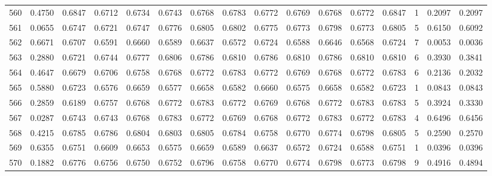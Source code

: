 \begin{tabular}{lrrrrrrrrrrrrrrr}
560 &      0.4750 &  0.6847 &  0.6712 &  0.6734 &  0.6743 &  0.6768 &  0.6783 &  0.6772 &  0.6769 &  0.6768 &   0.6772 &     0.6847 &      1 &                    0.2097 &                     0.2097 \\
561 &      0.0655 &  0.6747 &  0.6721 &  0.6747 &  0.6776 &  0.6805 &  0.6802 &  0.6775 &  0.6773 &  0.6798 &   0.6773 &     0.6805 &      5 &                    0.6150 &                     0.6092 \\
562 &      0.6671 &  0.6707 &  0.6591 &  0.6660 &  0.6589 &  0.6637 &  0.6572 &  0.6724 &  0.6588 &  0.6646 &   0.6568 &     0.6724 &      7 &                    0.0053 &                     0.0036 \\
563 &      0.2880 &  0.6721 &  0.6744 &  0.6777 &  0.6806 &  0.6786 &  0.6810 &  0.6786 &  0.6810 &  0.6786 &   0.6810 &     0.6810 &      6 &                    0.3930 &                     0.3841 \\
564 &      0.4647 &  0.6679 &  0.6706 &  0.6758 &  0.6768 &  0.6772 &  0.6783 &  0.6772 &  0.6769 &  0.6768 &   0.6772 &     0.6783 &      6 &                    0.2136 &                     0.2032 \\
565 &      0.5880 &  0.6723 &  0.6576 &  0.6659 &  0.6577 &  0.6658 &  0.6582 &  0.6660 &  0.6575 &  0.6658 &   0.6582 &     0.6723 &      1 &                    0.0843 &                     0.0843 \\
566 &      0.2859 &  0.6189 &  0.6757 &  0.6768 &  0.6772 &  0.6783 &  0.6772 &  0.6769 &  0.6768 &  0.6772 &   0.6783 &     0.6783 &      5 &                    0.3924 &                     0.3330 \\
567 &      0.0287 &  0.6743 &  0.6743 &  0.6768 &  0.6783 &  0.6772 &  0.6769 &  0.6768 &  0.6772 &  0.6783 &   0.6772 &     0.6783 &      4 &                    0.6496 &                     0.6456 \\
568 &      0.4215 &  0.6785 &  0.6786 &  0.6804 &  0.6803 &  0.6805 &  0.6784 &  0.6758 &  0.6770 &  0.6774 &   0.6798 &     0.6805 &      5 &                    0.2590 &                     0.2570 \\
569 &      0.6355 &  0.6751 &  0.6609 &  0.6653 &  0.6575 &  0.6659 &  0.6589 &  0.6637 &  0.6572 &  0.6724 &   0.6588 &     0.6751 &      1 &                    0.0396 &                     0.0396 \\
570 &      0.1882 &  0.6776 &  0.6756 &  0.6750 &  0.6752 &  0.6796 &  0.6758 &  0.6770 &  0.6774 &  0.6798 &   0.6773 &     0.6798 &      9 &                    0.4916 &                     0.4894 \\

\end{tabular}
